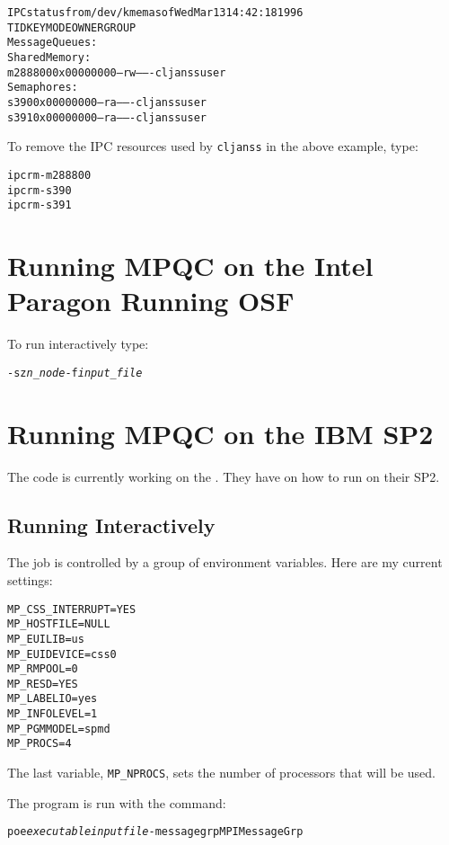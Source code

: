 \begin{alltt}
IPC status from /dev/kmem as of Wed Mar 13 14:42:18 1996
T     ID     KEY        MODE       OWNER    GROUP
Message Queues:
Shared Memory:
m 288800 0x00000000 --rw-------  cljanss     user
Semaphores:
s    390 0x00000000 --ra-------  cljanss     user
s    391 0x00000000 --ra-------  cljanss     user
\end{alltt}

To remove the IPC resources used by \verb|cljanss| in
the above example, type:

\begin{alltt}
ipcrm -m 288800
ipcrm -s 390
ipcrm -s 391
\end{alltt}

\section{Running MPQC on the Intel Paragon Running OSF}

To run interactively type:
\begin{alltt}
 -sz {\itshape n_node} -f {\itshape input_file}
\end{alltt}

\section{Running MPQC on the IBM SP2}

The code is currently working on the
.
They have 
on how to run on their SP2.

\subsection{Running Interactively}

The job is controlled by a group of environment variables.
Here are my current settings:
\begin{verbatim}
MP_CSS_INTERRUPT=YES
MP_HOSTFILE=NULL
MP_EUILIB=us
MP_EUIDEVICE=css0
MP_RMPOOL=0
MP_RESD=YES
MP_LABELIO=yes
MP_INFOLEVEL=1
MP_PGMMODEL=spmd
MP_PROCS=4
\end{verbatim}
The last variable, \verb|MP_NPROCS|, sets the number
of processors that will be used.

The program is run with the command:
\begin{alltt}
poe {\itshape executable} {\itshape inputfile} -messagegrp MPIMessageGrp
\end{alltt}

